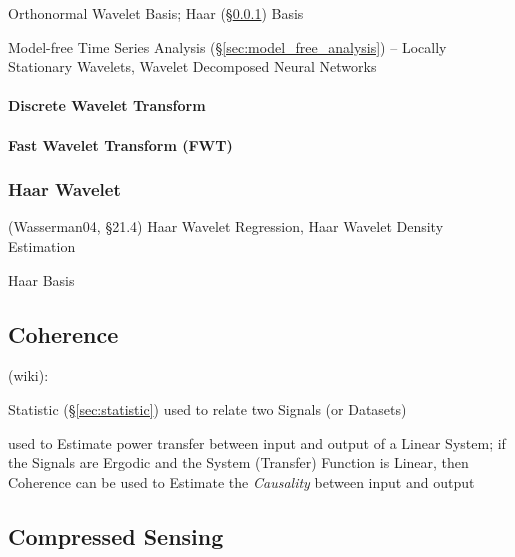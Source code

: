 Orthonormal Wavelet Basis; Haar (\S\ref{sec:haar_wavelet}) Basis

Model-free Time Series Analysis (\S\ref{sec:model_free_analysis}) -- Locally
Stationary Wavelets, Wavelet Decomposed Neural Networks



\paragraph{Discrete Wavelet Transform}
\label{sec:discrete_wavelet_transform}\hfill

\paragraph{Fast Wavelet Transform (FWT)}\label{sec:fwt}\hfill



\subsubsection{Haar Wavelet}\label{sec:haar_wavelet}

(Wasserman04, \S21.4) Haar Wavelet Regression, Haar Wavelet Density Estimation

Haar Basis



\subsection{Coherence}\label{sec:signal_coherence}

(wiki):

Statistic (\S\ref{sec:statistic}) used to relate two Signals (or Datasets)

used to Estimate power transfer between input and output of a Linear System; if
the Signals are Ergodic and the System (Transfer) Function is Linear, then
Coherence can be used to Estimate the \emph{Causality} between input and output



\subsection{Compressed Sensing}\label{sec:compressed_sensing}

